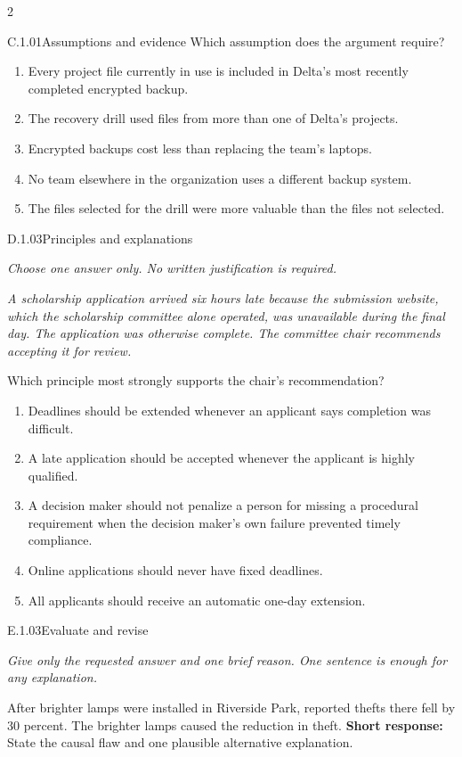 \documentclass[9pt]{extarticle}
\newcommand{\choice}[1]{\item #1}
\begin{document}
\begin{multicols}{2}
\begin{DenseCoreProblem}{C.1.01}{Assumptions and evidence}
Which assumption does the argument require?
\begin{enumerate}[label=(\alph*)]
  \choice{Every project file currently in use is included in Delta's most recently completed encrypted backup.}
  \choice{The recovery drill used files from more than one of Delta's projects.}
  \choice{Encrypted backups cost less than replacing the team's laptops.}
  \choice{No team elsewhere in the organization uses a different backup system.}
  \choice{The files selected for the drill were more valuable than the files not selected.}
\end{enumerate}
\end{DenseCoreProblem}
\begin{DenseCoreProblem}{D.1.03}{Principles and explanations}
{\scriptsize\textit{Choose one answer only. No written justification is required.}\par}
\emph{A scholarship application arrived six hours late because the submission website, which the scholarship committee alone operated, was unavailable during the final day. The application was otherwise complete. The committee chair recommends accepting it for review.}

Which principle most strongly supports the chair's recommendation?
\begin{enumerate}[label=(\alph*)]
  \choice{Deadlines should be extended whenever an applicant says completion was difficult.}
  \choice{A late application should be accepted whenever the applicant is highly qualified.}
  \choice{A decision maker should not penalize a person for missing a procedural requirement when the decision maker's own failure prevented timely compliance.}
  \choice{Online applications should never have fixed deadlines.}
  \choice{All applicants should receive an automatic one-day extension.}
\end{enumerate}
\end{DenseCoreProblem}
\begin{DenseCoreProblem}{E.1.03}{Evaluate and revise}
{\scriptsize\textit{Give only the requested answer and one brief reason. One sentence is enough for any explanation.}\par}
After brighter lamps were installed in Riverside Park, reported thefts there fell by 30 percent. The brighter lamps caused the reduction in theft.
\textbf{Short response:} State the causal flaw and one plausible alternative explanation.
\end{DenseCoreProblem}
\end{multicols}
\CoreWorkArea
\FormBreak
\end{document}
